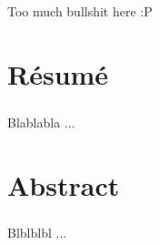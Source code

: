 \documentclass[a4paper,11pt]{report}
\begin{document}
        \paragraph{}
Too much bullshit here :P
    \clearpage


%
\chapter*{Résumé}
\paragraph{}
Blablabla ...
    \clearpage


%
\chapter*{Abstract}
\paragraph{}
Blblblbl ...
    \clearpage


%

\clearpage


%


\end{document}
